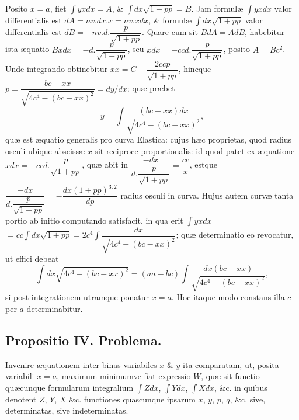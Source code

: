 Posito $x=a$, fiet $\int yxdx=A$, \& $\int dx\sqrt{1+pp}=B$. Jam formulæ $\int yxdx$ valor differentialis est $dA=nv.dx.x=nv.xdx$, \& formulæ $\int dx\sqrt{1+pp}$ valor differentialis est $dB=-nv.d.\dfrac{p}{\sqrt{1+pp}}$. Quare cum sit $BdA=AdB$, habebitur ista æquatio $Bxdx=-d.\dfrac{p}{\sqrt{1+pp}}$, seu $xdx=-ccd.\dfrac{p}{\sqrt{1+pp}}$, posito $A=Bc^2$. Unde integrando obtinebitur $xx=C-\dfrac{2ccp}{\sqrt{1+pp}}$, hincque $p=\dfrac{bc-xx}{\sqrt{4c^4-(bc-xx)^2}}=dy/dx$; quæ præbet
\[y=\int\frac{(bc-xx)dx}{\sqrt{4c^4-(bc-xx)^2}},\]
quæ est æquatio generalis pro curva Elastica: cujus hæc proprietas, quod radius osculi ubique abscissæ $x$ sit reciproce proportionalis: id quod patet ex æquatione $xdx=-ccd.\dfrac{p}{\sqrt{1+pp}}$, quæ abit in $\dfrac{-dx}{d.\dfrac{p}{\sqrt{1+pp}}}=\dfrac{cc}{x}$, estque $\dfrac{-dx}{d.\dfrac{p}{\sqrt{1+pp}}}=-\dfrac{dx(1+pp)^{3:2}}{dp}$ radius osculi in curva. Hujus autem curvæ tanta portio ab initio computando satisfacit, in qua erit $\int yxdx$
$=cc\int dx\sqrt{1+pp}=2c^4\int\dfrac{dx}{\sqrt{4c^4-(bc-xx)^2}}$; quæ determinatio eo revocatur, ut effici debeat
\[\int dx\sqrt{4c^4-(bc-xx)^2}=(aa-bc)\int\frac{dx(bc-xx)}{\sqrt{4c^4-(bc-xx)^2}},\]
si post integrationem utramque ponatur $x=a$. Hoc itaque modo constans illa $c$ per $a$ determinabitur.
\subsection*{Propositio IV. Problema.}
Invenire æquationem inter binas variabiles $x$ \& $y$ ita comparatam, ut, posita variabili $x=a$, maximum minimumve fiat expressio $W$, quæ sit functio quæcunque formularum integralium $\int Zdx$, $\int Ydx$, $\int Xdx$, \&c. in quibus denotent $Z$, $Y$, $X$ \&c. functiones quascunque ipsarum $x$, $y$, $p$, $q$, \&c. sive, determinatas, sive indeterminatas.
